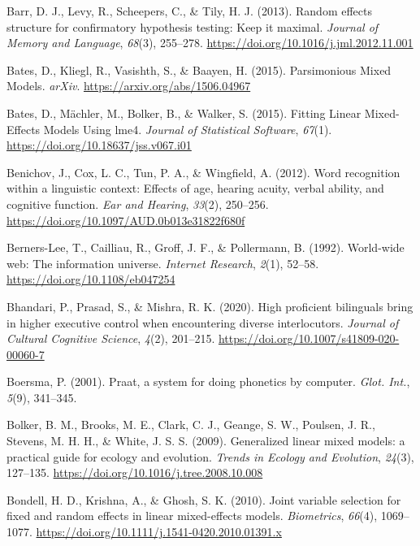 \documentclass[a4paper, nobind]{templates/ociamthesis}
\newlength{\cslhangindent}
\newenvironment{CSLReferences}[2] %
 {%
  \setlength{\parindent}{0pt}
  \ifodd #1
  \let\oldpar\par
  \def\par{\hangindent=\cslhangindent\oldpar}
  \fi
  \setlength{\parskip}{1mm}
  \setlength{\baselineskip}{6mm}
 }%
 {}
\begin{document}
\begin{CSLReferences}{1}{0}
\leavevmode{}%
Barr, D. J., Levy, R., Scheepers, C., \& Tily, H. J. (2013). Random effects structure for confirmatory hypothesis testing: Keep it maximal. \emph{Journal of Memory and Language}, \emph{68}(3), 255--278. \url{https://doi.org/10.1016/j.jml.2012.11.001}

\leavevmode{}%
Bates, D., Kliegl, R., Vasishth, S., \& Baayen, H. (2015). {Parsimonious Mixed Models}. \emph{arXiv}. \url{https://arxiv.org/abs/1506.04967}

\leavevmode{}%
Bates, D., Mächler, M., Bolker, B., \& Walker, S. (2015). Fitting Linear Mixed-Effects Models Using lme4. \emph{Journal of Statistical Software}, \emph{67}(1). \url{https://doi.org/10.18637/jss.v067.i01}

\leavevmode{}%
Benichov, J., Cox, L. C., Tun, P. A., \& Wingfield, A. (2012). {Word recognition within a linguistic context: Effects of age, hearing acuity, verbal ability, and cognitive function}. \emph{Ear and Hearing}, \emph{33}(2), 250--256. \url{https://doi.org/10.1097/AUD.0b013e31822f680f}

\leavevmode{}%
Berners-Lee, T., Cailliau, R., Groff, J. F., \& Pollermann, B. (1992). {World-wide web: The information universe}. \emph{Internet Research}, \emph{2}(1), 52--58. \url{https://doi.org/10.1108/eb047254}

\leavevmode{}%
Bhandari, P., Prasad, S., \& Mishra, R. K. (2020). High proficient bilinguals bring in higher executive control when encountering diverse interlocutors. \emph{Journal of Cultural Cognitive Science}, \emph{4}(2), 201--215. \url{https://doi.org/10.1007/s41809-020-00060-7}

\leavevmode{}%
Boersma, P. (2001). Praat, a system for doing phonetics by computer. \emph{Glot. Int.}, \emph{5}(9), 341--345.

\leavevmode{}%
Bolker, B. M., Brooks, M. E., Clark, C. J., Geange, S. W., Poulsen, J. R., Stevens, M. H. H., \& White, J. S. S. (2009). {Generalized linear mixed models: a practical guide for ecology and evolution}. \emph{Trends in Ecology and Evolution}, \emph{24}(3), 127--135. \url{https://doi.org/10.1016/j.tree.2008.10.008}

\leavevmode{}%
Bondell, H. D., Krishna, A., \& Ghosh, S. K. (2010). Joint variable selection for fixed and random effects in linear mixed-effects models. \emph{Biometrics}, \emph{66}(4), 1069--1077. \url{https://doi.org/10.1111/j.1541-0420.2010.01391.x}


\end{CSLReferences}
\end{document}

